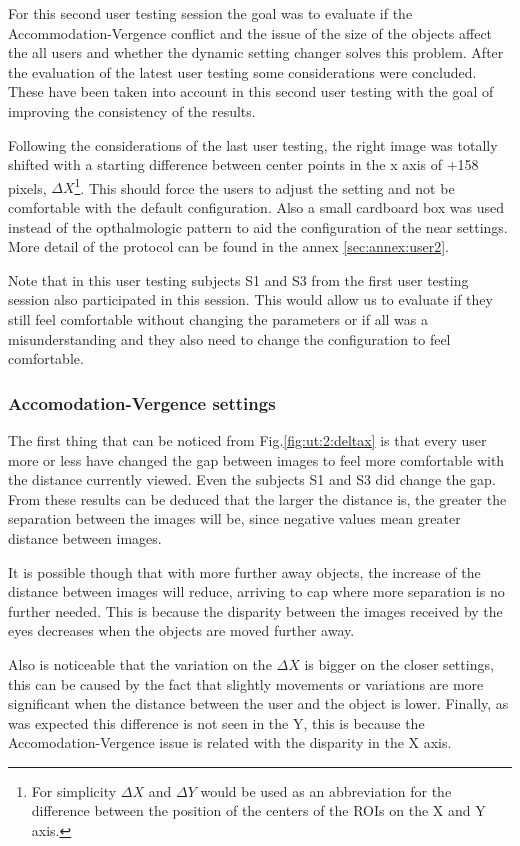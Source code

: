 \documentclass[10pt,a4paper,twocolumn,twoside]{article}
\begin{document}
	For this second user testing session the goal was to evaluate if the Accommodation-Vergence conflict and the issue of the size of the objects affect the all users and whether the dynamic setting changer solves this problem. After the evaluation of the latest user testing some considerations were concluded. These have been taken into account in this second user testing with the goal of improving the consistency of the results. 
	
	Following the considerations of the last user testing, the right image was totally shifted with a starting difference between center points in the x axis of +158 pixels, $\Delta X$\footnote{For simplicity  $\Delta X$ and $\Delta Y$ would be used as an abbreviation for the difference between the position of the centers of the ROIs on the X and Y axis. }. This should force the users to adjust the setting and not be comfortable with the default configuration. Also a small cardboard box was used instead of the opthalmologic pattern to aid the configuration of the near settings. More detail of the protocol can be found in the annex \ref{sec:annex:user2}.
	
	Note that in this user testing subjects S1 and S3 from the first user testing session also participated in this session. This would allow us to evaluate if they still feel comfortable without changing the parameters or if all was a misunderstanding and they also need to change the configuration to feel comfortable. 
	
	\subsubsection{Accomodation-Vergence settings}
	The first thing that can be noticed from Fig.\ref{fig:ut:2:deltax} is that every user more or less have changed the gap between images to feel more comfortable with the distance currently viewed. Even the subjects S1 and S3 did change the gap. From these results can be deduced that the larger the distance is, the greater the separation between the images will be, since negative values mean greater distance between images. 
	
	It is possible though that with more further away objects, the increase of the distance between images will reduce, arriving to cap where more separation is no further needed. This is because the disparity between the images received by the eyes decreases when the objects are moved further away.
	
	Also is noticeable that the variation on the $\Delta X$ is bigger on the closer settings, this can be caused by the fact that slightly movements or variations are more significant when the distance between the user and the object is lower. 
	Finally, as was expected this difference is not seen in the Y, this is because the Accomodation-Vergence issue is related with the disparity in the X axis. 
	
\end{document}
